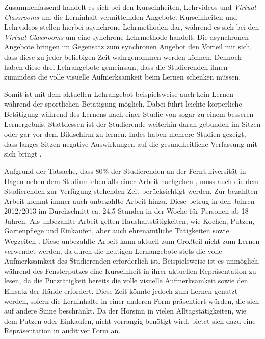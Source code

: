 Zusammenfassend handelt es sich bei den Kurseinheiten, Lehrvideos und \textit{Virtual Classrooms} um  die Lerninhalt vermittelnden Angebote. Kurseinheiten und Lehrvideos stellen hierbei asynchrone Lehrmethoden dar, während es sich bei den \textit{Virtual Classrooms} um eine synchrone Lehrmethode handelt. Die asynchronen Angebote bringen im Gegensatz zum synchronen Angebot den Vorteil mit sich, dass diese zu jeder beliebigen Zeit wahrgenommen werden können. Dennoch haben diese drei Lehrangebote gemeinsam, dass die Studierenden ihnen zumindest die volle visuelle Aufmerksamkeit beim Lernen schenken müssen. 

Somit ist mit dem aktuellen Lehrangebot beispielsweise auch kein Lernen während der sportlichen Betätigung möglich. Dabei führt leichte körperliche Betätigung während des Lernens nach einer Studie von \cite{schmidt2013physical} sogar zu einem besseren Lernergebnis. Stattdessen ist der Studierende weiterhin daran gebunden im Sitzen oder gar vor dem Bildschirm zu lernen. Indes haben mehrere Studien gezeigt, dass langes Sitzen negative Auswirkungen auf die gesundheitliche Verfassung mit sich bringt \citep{tremblay2011systematic}.

Aufgrund der Tatsache, dass 80\% der Studierenden an der FernUniversität in Hagen neben dem Studium ebenfalls einer Arbeit nachgehen \citep{fernuniversitaet2018stat}, muss auch die dem Studierenden zur Verfügung stehenden Zeit berücksichtigt werden. Zur bezahlten Arbeit kommt immer auch unbezahlte Arbeit hinzu. Diese betrug in den Jahren 2012/2013 im Durchschnitt ca. 24,5 Stunden in der Woche für Personen ab 18 Jahren. Als unbezahlte Arbeit gelten Haushaltstätigkeiten, wie Kochen, Putzen, Gartenpflege und Einkaufen, aber auch ehrenamtliche Tätigkeiten sowie Wegzeiten \citep{destatis2015zeit}. Diese unbezahlte Arbeit kann aktuell zum Großteil nicht zum Lernen verwendet werden, da durch die heutigen Lernangebote stets die volle Aufmerksamkeit des Studierenden erforderlich ist. Beispielsweise ist es unmöglich, während des Fensterputzes eine Kurseinheit in ihrer aktuellen Repräsentation zu lesen, da die Putztätigkeit bereits die volle visuelle Aufmerksamkeit sowie den Einsatz der Hände erfordert. Diese Zeit könnte jedoch zum Lernen genutzt werden, sofern die Lerninhalte in einer anderen Form präsentiert würden, die sich auf andere Sinne beschränkt. Da der Hörsinn in vielen Alltagstätigkeiten, wie dem Putzen oder Einkaufen, nicht vorrangig benötigt wird, bietet sich dazu eine Repräsentation in auditiver Form an.

